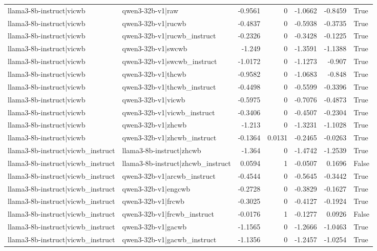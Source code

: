 \begin{table}
\begin{tabular}{l l r r r r l}
llama3-8b-instruct|vicwb & qwen3-32b-v1|raw & -0.9561 & 0 & -1.0662 & -0.8459 & True \\
llama3-8b-instruct|vicwb & qwen3-32b-v1|rucwb & -0.4837 & 0 & -0.5938 & -0.3735 & True \\
llama3-8b-instruct|vicwb & qwen3-32b-v1|rucwb_instruct & -0.2326 & 0 & -0.3428 & -0.1225 & True \\
llama3-8b-instruct|vicwb & qwen3-32b-v1|swcwb & -1.249 & 0 & -1.3591 & -1.1388 & True \\
llama3-8b-instruct|vicwb & qwen3-32b-v1|swcwb_instruct & -1.0172 & 0 & -1.1273 & -0.907 & True \\
llama3-8b-instruct|vicwb & qwen3-32b-v1|thcwb & -0.9582 & 0 & -1.0683 & -0.848 & True \\
llama3-8b-instruct|vicwb & qwen3-32b-v1|thcwb_instruct & -0.4498 & 0 & -0.5599 & -0.3396 & True \\
llama3-8b-instruct|vicwb & qwen3-32b-v1|vicwb & -0.5975 & 0 & -0.7076 & -0.4873 & True \\
llama3-8b-instruct|vicwb & qwen3-32b-v1|vicwb_instruct & -0.3406 & 0 & -0.4507 & -0.2304 & True \\
llama3-8b-instruct|vicwb & qwen3-32b-v1|zhcwb & -1.213 & 0 & -1.3231 & -1.1028 & True \\
llama3-8b-instruct|vicwb & qwen3-32b-v1|zhcwb_instruct & -0.1364 & 0.0131 & -0.2465 & -0.0263 & True \\
llama3-8b-instruct|vicwb_instruct & llama3-8b-instruct|zhcwb & -1.364 & 0 & -1.4742 & -1.2539 & True \\
llama3-8b-instruct|vicwb_instruct & llama3-8b-instruct|zhcwb_instruct & 0.0594 & 1 & -0.0507 & 0.1696 & False \\
llama3-8b-instruct|vicwb_instruct & qwen3-32b-v1|arcwb_instruct & -0.4544 & 0 & -0.5645 & -0.3442 & True \\
llama3-8b-instruct|vicwb_instruct & qwen3-32b-v1|engcwb & -0.2728 & 0 & -0.3829 & -0.1627 & True \\
llama3-8b-instruct|vicwb_instruct & qwen3-32b-v1|frcwb & -0.3025 & 0 & -0.4127 & -0.1924 & True \\
llama3-8b-instruct|vicwb_instruct & qwen3-32b-v1|frcwb_instruct & -0.0176 & 1 & -0.1277 & 0.0926 & False \\
llama3-8b-instruct|vicwb_instruct & qwen3-32b-v1|gacwb & -1.1565 & 0 & -1.2666 & -1.0463 & True \\
llama3-8b-instruct|vicwb_instruct & qwen3-32b-v1|gacwb_instruct & -1.1356 & 0 & -1.2457 & -1.0254 & True \\

\end{tabular}
\end{table}
